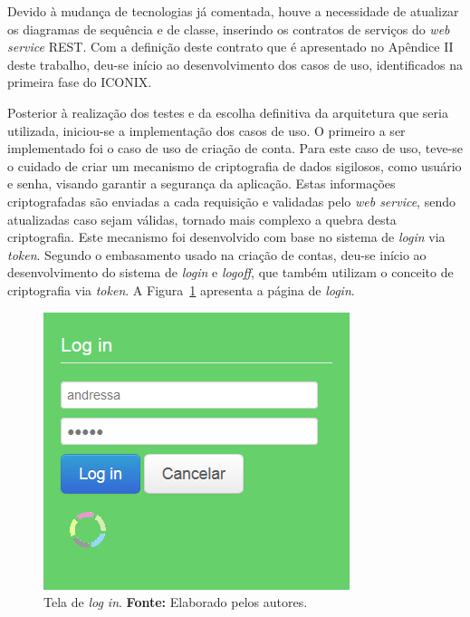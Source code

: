 \par Devido à mudança de tecnologias já comentada, houve a necessidade de atualizar os diagramas de sequência e de classe, inserindo os contratos de serviços do \textit{web service} REST. Com a definição deste contrato que é apresentado no Apêndice II deste trabalho, deu-se início ao desenvolvimento dos casos de uso, identificados na primeira fase do ICONIX. 

\par Posterior à realização dos testes e da escolha definitiva da arquitetura que seria utilizada, iniciou-se a implementação dos casos de uso. O primeiro a ser implementado foi o caso de uso de criação de conta. Para este caso de uso, teve-se o cuidado de criar um mecanismo de criptografia de dados sigilosos, como usuário e senha, visando garantir a segurança da aplicação. Estas informações criptografadas são enviadas a cada requisição e validadas pelo \textit{web service}, sendo atualizadas caso sejam válidas, tornado mais complexo a quebra desta criptografia. Este mecanismo foi desenvolvido com base no sistema de \textit{login} via \textit{token}. Segundo o embasamento usado na criação de contas, deu-se início ao desenvolvimento do sistema de \textit{login} e \textit{logoff}, que também utilizam o conceito de criptografia via \textit{token}. A Figura~\ref{fig:pagina_login} apresenta a página de \textit{login}.

\begin{figure}[h!]
	\centerline{\includegraphics[scale=0.60]{./imagens/login.jpg}}
	\caption[Tela de \textit{log in}.]
	{Tela de \textit{log in}. \textbf{Fonte:} Elaborado pelos autores.}
	\label{fig:pagina_login}
\end{figure}

